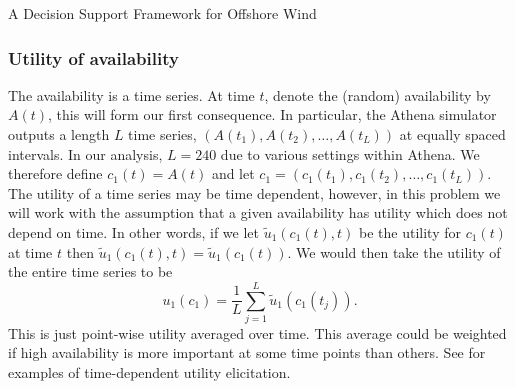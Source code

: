 \begin{chapter}{A Decision Support Framework for Offshore Wind \label{Ch:ds-for-ow}}
\subsubsection{Utility of availability}
The availability is a time series. At time $t$, denote the (random) availability by $A(t)$, this will form our first consequence. In particular, the Athena simulator outputs a length $L$ time series, $(A(t_1), A(t_2), \ldots, A(t_{L}))$ at equally spaced intervals. In our analysis, $L = 240$ due to various settings within Athena. We therefore define $c_1(t) = A(t)$ and let $c_1 = (c_1(t_1), c_1(t_2), \ldots, c_{1}(t_{L}))$. The utility of a time series may be time dependent, however, in this problem we will work with the assumption that a given availability has utility which does not depend on time. In other words, if we let $\tilde{u}_1(c_1(t), t)$ be the utility for $c_1(t)$ at time $t$ then $\tilde{u}_1(c_1(t), t) = \tilde{u}_1(c_1(t))$. We would then take the utility of the entire time series to be
\begin{equation}
 u_1(c_1) = \frac{1}{L}\sum_{j = 1}^{L} \tilde{u}_1(c_1(t_j)).
\end{equation}
This is just point-wise utility averaged over time. This average could be weighted if high availability is more important at some time points than others. See \citet{Rios2003} for examples of time-dependent utility elicitation.


\end{chapter}
